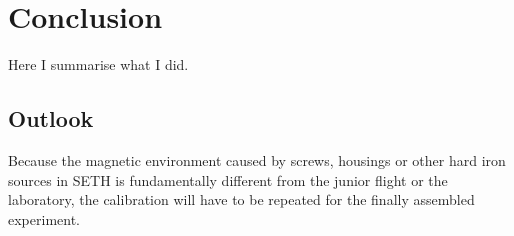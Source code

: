 \chapter{Conclusion \label{ch:conclusion}}
Here I summarise what I did.

\section{Outlook \label{sec:outlook}}
Because the magnetic environment caused by screws, housings or other hard iron sources in \ac{SETH} is fundamentally different from the junior flight or the laboratory, the calibration will have to be repeated for the finally assembled experiment.